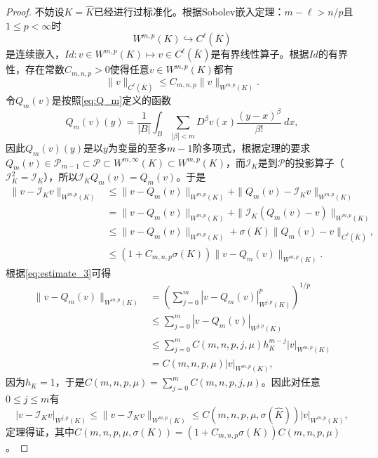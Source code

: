 \documentclass[a4paper,10pt]{ctexart}
\begin{document}
\begin{proof}
    不妨设$ K = \hat{K} $已经进行过标准化。根据Sobolev嵌入定理：$ m-\ell> n / p $且$ 1\leqslant p<\infty $时
    \begin{equation}
        W^{m,p}(K) \hookrightarrow C^\ell(\overline{K})
    \end{equation}
    是连续嵌入，$ Id:v\in W^{m,p}(K)\mapsto v\in C^\ell(\overline{K}) $是有界线性算子。根据$ Id $的有界性，存在常数$ C_{m,n,p}>0 $使得任意$ v\in W^{m,p}(K) $都有
    \begin{equation}
        \| v \|_{C^\ell(\overline{K})} \leqslant C_{m,n,p} \| v \|_{W^{m,p}(K)}.
    \end{equation}
    令$ Q_m(v) $是按照\eqref{eq:Q_m}定义的函数
    \[
        Q_m(v)(y) = \frac{1}{|B|}\int_B \sum_{|\beta|<m} D^\beta v(x) \frac{(y-x)^\beta}{\beta!}\ dx,
    \]
    因此$ Q_m(v)(y) $是以$ y $为变量的至多$ m-1 $阶多项式，根据定理的要求$ Q_m(v)\in \mathcal{P}_{m-1}\subset \mathcal{P}\subset W^{m,\infty}(K)\subset W^{m,p}(K) $，而$ \mathcal{I}_K $是到$ \mathcal{P} $的投影算子（$ \mathcal{I}_K^2 = \mathcal{I}_K $），所以$ \mathcal{I}_KQ_m(v) = Q_m(v) $。于是
    \[
        \begin{aligned}
            \| v-\mathcal{I}_Kv \|_{W^{m,p}(K)} 
            &\leqslant \| v-Q_m(v) \|_{W^{m,p}(K)} + \| Q_m(v) - \mathcal{I}_Kv \|_{W^{m,p}(K)}\\
            &= \| v-Q_m(v) \|_{W^{m,p}(K)} + \| \mathcal{I}_K(Q_m(v) - v) \|_{W^{m,p}(K)}\\
            &\leqslant \| v-Q_m(v) \|_{W^{m,p}(K)} + \sigma(K) \| Q_m(v) - v \|_{C^\ell(\overline{K})},\\
            &\leqslant (1+ C_{m,n,p}\sigma(K))\| v-Q_m(v) \| _{W^{m,p}(K)}.
        \end{aligned}
    \]
    根据\eqref{eq:estimate_3}可得
    \[
        \begin{aligned}
            \| v-Q_m(v) \|_{W^{m,p}(K)} 
            &= \left( \sum_{j=0}^m |v-Q_m(v)|_{W^{j,p}(K)}^p \right) ^{1 / p} \\
            &\leqslant \sum_{j=0}^m |v-Q_m(v)|_{W^{j,p}(K)}\\
            &\leqslant \sum_{j=0}^m C(m,n,p,j,\mu)h_K^{m-j} |v|_{W^{m,p}(K)}\\
            &= C(m,n,p,\mu) |v|_{W^{m,p}(K)},
        \end{aligned}
    \]
    因为$ h_K=1 $，于是$ C(m,n,p,\mu) = \sum_{j=0}^m C(m,n,p,j,\mu) $。因此对任意$ 0\leqslant j\leqslant m $有
    \[
        |v-\mathcal{I}_Kv|_{W^{j,p}(K)} \leqslant \| v-\mathcal{I}_K v \|_{W^{m,p}(K)}  \leqslant C(m,n,p,\mu,\sigma(\hat{K})) |v|_{W^{m,p}(K)},
    \]
    定理得证，其中$ C(m,n,p,\mu,\sigma(K)) = (1+C_{m,n,p}\sigma(K))C(m,n,p,\mu) $。
\end{proof}
\end{document}
